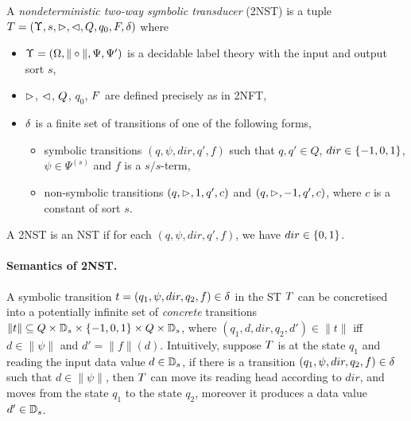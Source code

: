 \begin{definition}
    A \emph{nondeterministic two-way  symbolic \emph{transducer}} (2NST) is a tuple $T = (\Upsilon, s, \vartriangleright, \vartriangleleft, Q, q_0, F, \delta)$ where  
\begin{itemize}
\item $\Upsilon=(\Omega, \| \circ \|, \Psi, \Psi')$ is a decidable label theory with the input and output sort $s$,
%
\item $\vartriangleright$, $\vartriangleleft$, $Q$, $q_0$, $F$ are defined precisely as in 2NFT, 
%
\item $\delta$ is a finite set of  transitions of one of the following forms,
\begin{itemize}
\item symbolic transitions $(q, \psi, dir, q', f)$ such that $q, q' \in Q$, $dir \in \{-1, 0, 1\}$, $\psi \in \Psi^{(s)}$ and
$f$ is a $s /s$-term, 
\item non-symbolic transitions $(q, \vartriangleright, 1, q', c)$ and $(q, \vartriangleright, -1, q', c)$, where $c$ is a constant of sort $s$. 
\end{itemize}
\end{itemize}
A 2NST is an NST if for each $(q, \psi, dir, q', f)$, we have $dir \in \{0, 1\}$.
\end{definition}

\paragraph{Semantics of 2NST.}
A symbolic transition $t=(q_1,\psi, dir, q_2, f) \in \delta$ in the ST $T$ can be concretised
into a potentially infinite set of \emph{concrete} transitions $\|t\| \subseteq Q \times \mathbb{D}_{s} \times \{-1, 0, 1\} \times Q \times \mathbb{D}_{s}$, where $(q_1, d, dir, q_2, d')  \in \|t\|$ iff $d \in \|\psi\|$ and $d' = \|f\|(d)$.
Intuitively, suppose $T$ is at the state $q_1$ and reading the input data value $d \in \mathbb{D}_{s}$,
if there is a transition $(q_1, \psi, dir, q_2, f )\in \delta$ such that $d \in \|\psi\|$, then $T$ can move its reading head according to $dir$, and moves from the state
$q_1$ to the state $q_2$, moreover it produces a data value $d' \in \mathbb{D}_{s}$.

